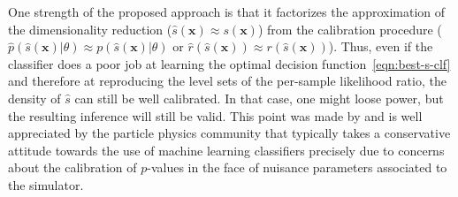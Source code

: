 \documentclass[12pt]{article}
\numberwithin{equation}{section}
\theoremstyle{plain}
\begin{document}


One strength of the proposed approach is that it factorizes the approximation of
the dimensionality reduction ($\hat{s}(\mathbf{x}) \approx s(\mathbf{x})$) from the
calibration procedure ($\hat p(\hat s(\mathbf{x})| \theta) \approx
p(\hat{s}(\mathbf{x})|\theta)$ or $\hat{r}(\hat{s}(\mathbf{x})) \approx r(\hat{s}(\mathbf{x}))$). Thus, even if the classifier does a poor job at
learning the optimal decision function~\ref{eqn:best-s-clf} and therefore at
reproducing the level sets of the per-sample likelihood ratio, the density of
$\hat{s}$ can still be well calibrated. In that case, one might loose power, but
the resulting inference will still be valid. This point was made by
\cite{Neal:2007zz} and is well appreciated by the particle physics community
that typically takes a conservative attitude towards the use of machine learning
classifiers precisely due to concerns about the calibration of $p$-values in the
face of nuisance parameters associated to the simulator.
\end{document}
